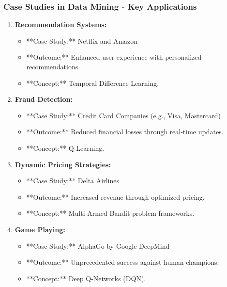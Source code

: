 \documentclass[aspectratio=169]{beamer}
\begin{document}
\begin{frame}[fragile]
    \frametitle{Case Studies in Data Mining - Key Applications}
    \begin{enumerate}
        \item \textbf{Recommendation Systems:} 
        \begin{itemize}
            \item **Case Study:** Netflix and Amazon
            \item **Outcome:** Enhanced user experience with personalized recommendations.
            \item **Concept:** Temporal Difference Learning.
        \end{itemize}
        
        \item \textbf{Fraud Detection:}
        \begin{itemize}
            \item **Case Study:** Credit Card Companies (e.g., Visa, Mastercard)
            \item **Outcome:** Reduced financial losses through real-time updates.
            \item **Concept:** Q-Learning.
        \end{itemize}
        
        \item \textbf{Dynamic Pricing Strategies:}
        \begin{itemize}
            \item **Case Study:** Delta Airlines
            \item **Outcome:** Increased revenue through optimized pricing.
            \item **Concept:** Multi-Armed Bandit problem frameworks.
        \end{itemize}
        
        \item \textbf{Game Playing:}
        \begin{itemize}
            \item **Case Study:** AlphaGo by Google DeepMind
            \item **Outcome:** Unprecedented success against human champions.
            \item **Concept:** Deep Q-Networks (DQN).
        \end{itemize}
    \end{enumerate}
\end{frame}
\end{document}
